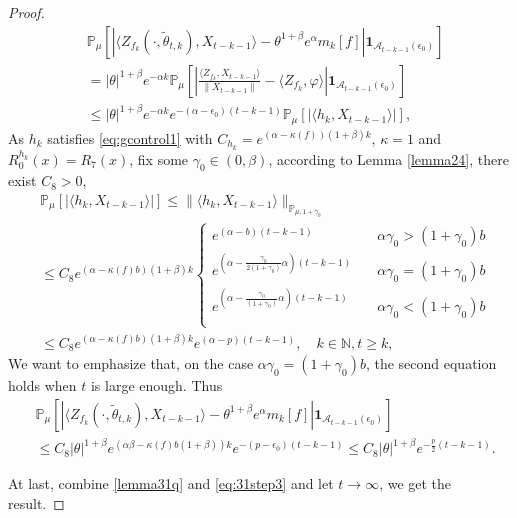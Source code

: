 \documentclass[12pt,oneside,english]{amsart}
\theoremstyle{plain}
\theoremstyle{definition}
\numberwithin{equation}{section}
\begin{document}
\begin{proof}
\begin{align}
        &\mathbb{P}_{\mu}\left[\left|\langle Z_{f_k}(\cdot,\tilde{\theta}_{t,k}),X_{t-k-1}\rangle-\theta^{1+\beta}e^{\alpha}m_k[f]\right|\mathbf{1}_{\mathcal{A}_{t-k-1}(\epsilon_0)}\right]\\
    &=|\theta|^{1+\beta}e^{-\alpha k}\mathbb{P}_{\mu}\left[\left|\frac{\langle Z_{f_k},X_{t-k-1}\rangle}{\|X_{t-k-1}\|}-\langle Z_{f_k},\varphi\rangle\right|\mathbf{1}_{\mathcal{A}_{t-k-1}(\epsilon_0)}\right]\nonumber\\
    &\leq |\theta|^{1+\beta}e^{-\alpha k}e^{-(\alpha-\epsilon_0)(t-k-1)}\mathbb{P}_{\mu}\left[\left|\langle h_k,X_{t-k-1}\rangle\right|\right],\label{II1}
\end{align}
As $h_k$ satisfies \eqref{eq:gcontrol1} with $C_{h_k}=e^{(\alpha-\kappa(f))(1+\beta)k}$, $\kappa=1$ and $R_0^{h_k}(x)=R_7(x)$, fix some $\gamma_0\in(0,\beta)$, according to Lemma \ref{lemma24}, there exist $C_8>0$,
\begin{align}
    &\mathbb{P}_{\mu}\left[\left|\langle h_k,X_{t-k-1}\rangle\right|\right]\leq \|\langle h_k, X_{t-k-1}\rangle\|_{\mathbb{P}_{\mu,1+\gamma_0}}\\
    &\leq C_8 e^{(\alpha-\kappa(f)b)(1+\beta)k}
    \begin{cases}
    e^{(\alpha-b)(t-k-1)}\quad &\alpha\gamma_0>(1+\gamma_0)b\\
    e^{(\alpha-\frac{\gamma_0}{2(1+\gamma_0)}\alpha)(t-k-1)}\quad &\alpha\gamma_0=(1+\gamma_0)b\\
    e^{(\alpha-\frac{\gamma_0}{(1+\gamma_0)}\alpha)(t-k-1)}\quad &\alpha\gamma_0<(1+\gamma_0)b\\
    \end{cases}
    \\& \leq C_8 e^{(\alpha-\kappa(f)b)(1+\beta)k}e^{(\alpha-p)(t-k-1)}, \quad k\in \mathbb{N}, t\geq k,
\end{align}
We want to emphasize that, on the case $\alpha\gamma_0=(1+\gamma_0)b$, the second equation holds when $t$ is large enough. Thus
\begin{align}
    &\mathbb{P}_{\mu}\left[\left|\langle Z_{f_k}(\cdot,\tilde{\theta}_{t,k}),X_{t-k-1}\rangle-\theta^{1+\beta}e^{\alpha}m_k[f]\right|\mathbf{1}_{\mathcal{A}_{t-k-1}(\epsilon_0)}\right]
    \\ & \leq C_8 |\theta|^{1+\beta}e^{(\alpha\beta-\kappa(f)b(1+\beta))k}e^{-(p-\epsilon_0)(t-k-1)} \leq C_8 |\theta|^{1+\beta}e^{-\frac{p}{2}(t-k-1)}.
\end{align}

At last, combine \eqref{lemma31q} and \eqref{eq:31step3} and let $t\rightarrow\infty$, we get the result.
\end{proof}
\end{document}
